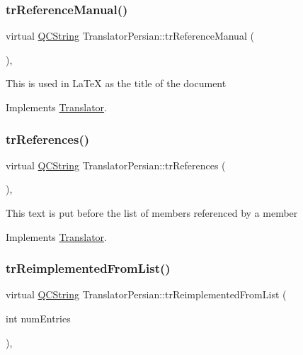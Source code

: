 \subsubsection{\texorpdfstring{trReferenceManual()}{trReferenceManual()}}
{\footnotesize\ttfamily virtual \mbox{\hyperlink{class_q_c_string}{Q\+C\+String}} Translator\+Persian\+::tr\+Reference\+Manual (\begin{DoxyParamCaption}{ }\end{DoxyParamCaption})\hspace{0.3cm}{\ttfamily [inline]}, {\ttfamily [virtual]}}

This is used in La\+TeX as the title of the document 

Implements \mbox{\hyperlink{class_translator}{Translator}}.

\mbox{\label{class_translator_persian_ad74999932851a84177da4e46c440524b}} 
\subsubsection{\texorpdfstring{trReferences()}{trReferences()}}
{\footnotesize\ttfamily virtual \mbox{\hyperlink{class_q_c_string}{Q\+C\+String}} Translator\+Persian\+::tr\+References (\begin{DoxyParamCaption}{ }\end{DoxyParamCaption})\hspace{0.3cm}{\ttfamily [inline]}, {\ttfamily [virtual]}}

This text is put before the list of members referenced by a member 

Implements \mbox{\hyperlink{class_translator}{Translator}}.

\mbox{\label{class_translator_persian_a41187ae168e667bf16d5b10d23930781}} 
\subsubsection{\texorpdfstring{trReimplementedFromList()}{trReimplementedFromList()}}
{\footnotesize\ttfamily virtual \mbox{\hyperlink{class_q_c_string}{Q\+C\+String}} Translator\+Persian\+::tr\+Reimplemented\+From\+List (\begin{DoxyParamCaption}\item[{int}]{num\+Entries }\end{DoxyParamCaption})\hspace{0.3cm}{\ttfamily [inline]}, {\ttfamily [virtual]}}


